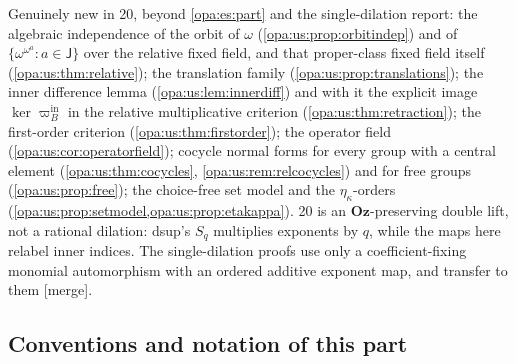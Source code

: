 \documentclass[11pt,oneside]{article}
\numberwithin{equation}{section}
\theoremstyle{definition}
\theoremstyle{remark}
\newcommand{\Oz}{\mathbf{Oz}}
\newcommand{\mergetag}{\textup{\textsf{\small[merge]}}}
\begin{document}
Genuinely new in 20, beyond \cref{opa:es:part} and the single-dilation report: the algebraic independence of the orbit of $\omega$
(\cref{opa:us:prop:orbitindep}) and of $\{\omega^{\omega^a}:a\in\mathsf J\}$ over the relative fixed field, and that proper-class fixed
field itself (\cref{opa:us:thm:relative}); the translation family (\cref{opa:us:prop:translations}); the inner difference lemma
(\cref{opa:us:lem:innerdiff}) and with it the explicit image $\ker\varpi^{\mathrm{in}}_B$ in the relative multiplicative criterion
(\cref{opa:us:thm:retraction}); the first-order criterion (\cref{opa:us:thm:firstorder}); the operator field
(\cref{opa:us:cor:operatorfield}); cocycle normal forms for every group with a central element (\cref{opa:us:thm:cocycles},
\cref{opa:us:rem:relcocycles}) and for free groups (\cref{opa:us:prop:free}); the choice-free set model and the
$\eta_\kappa$-orders (\cref{opa:us:prop:setmodel,opa:us:prop:etakappa}). 20 is an $\Oz$-preserving double lift, not a rational
dilation: dsup's $S_q$ multiplies exponents by $q$, while the maps here relabel inner indices. The single-dilation proofs use only a
coefficient-fixing monomial automorphism with an ordered additive exponent map, and transfer to them \mergetag.

\subsection{Conventions and notation of this part}\label{opa:us:sub:notation}
\end{document}
